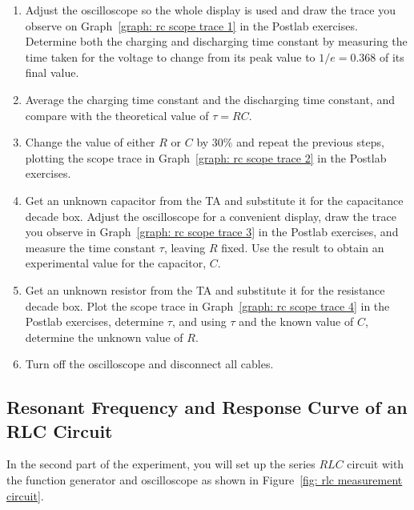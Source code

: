 \documentclass[addpoints]{physlabs}
\begin{document}
\begin{labsection}
\begin{experiment}
\begin{enumerate}
    \item Adjust the oscilloscope so the whole display is used and draw the trace you observe on Graph~\ref{graph: rc scope trace 1} in the Postlab exercises. Determine both the charging and discharging time constant by measuring the time taken for the voltage to change from its peak value to $1/e=0.368$ of its final value.

    \item Average the charging time constant and the discharging time constant, and compare with the theoretical value of $\tau=RC$.

    \item Change the value of either $R$ or $C$ by 30\% and repeat the previous steps, plotting the scope trace in Graph~\ref{graph: rc scope trace 2} in the Postlab exercises.
    
    \item Get an unknown capacitor from the TA and substitute it for the capacitance decade box. Adjust the oscilloscope for a convenient display, draw the trace you observe in Graph~\ref{graph: rc scope trace 3} in the Postlab exercises, and measure the time constant $\tau$, leaving $R$ fixed. Use the result to obtain an experimental value for the capacitor, $C$.
    
    \item Get an unknown resistor from the TA and substitute it for the resistance decade box. Plot the scope trace in Graph~\ref{graph: rc scope trace 4} in the Postlab exercises, determine $\tau$, and using $\tau$ and the known value of $C$, determine the unknown value of $R$.
    
    \item Turn off the oscilloscope and disconnect all cables.
\end{enumerate}

\subsection*{Resonant Frequency and Response Curve of an RLC Circuit}

In the second part of the experiment, you will set up the series $RLC$ circuit with the function generator and oscilloscope as shown in Figure~\ref{fig: rlc measurement circuit}.


\end{experiment}
\end{labsection}
\end{document}
